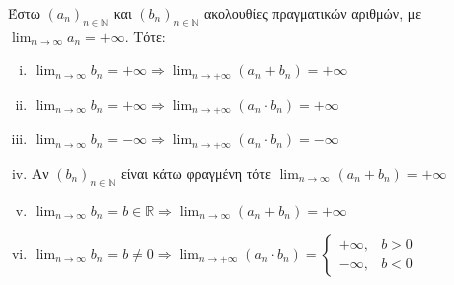 \documentclass[a4paper,table]{report}
\begin{document}
\begin{mybox3}
  \begin{prop}
    Έστω $ {(a_{n})}_{n \in \mathbb{N}} $ και $ {(b_{n})}_{n \in \mathbb{N}} $ ακολουθίες 
    πραγματικών αριθμών, με $ \lim_{n \to \infty} a_{n}= +\infty $. Τότε:
    \begin{enumerate}[i)]
      \item $ \lim_{n \to \infty} b_{n} = +\infty \Rightarrow \lim_{n \to +\infty}
        (a_{n}+b_{n})= +\infty$
      \item $ \lim_{n \to \infty} b_{n} = +\infty \Rightarrow \lim_{n \to +\infty}
        (a_{n}\cdot b_{n})= +\infty$
      \item $ \lim_{n \to \infty} b_{n} = -\infty \Rightarrow \lim_{n \to +\infty}
        (a_{n}\cdot b_{n})= -\infty$
      \item Αν $ {(b_{n})}_{n \in \mathbb{N}} $ είναι κάτω φραγμένη τότε $ \lim_{n \to
        \infty} (a_{n}+b_{n}) = +\infty $
      \item $ \lim_{n \to \infty} b_{n} = b \in \mathbb{R} 
        \Rightarrow \lim_{n \to \infty} (a_{n}+b_{n})= +\infty$
      \item $ \lim_{n \to \infty} b_{n} = b \neq 0 
        \Rightarrow \lim_{n \to +\infty} (a_{n}\cdot b_{n})= 
        \begin{cases} 
          +\infty, & b >0 \\
          -\infty, & b <0 
        \end{cases} $
    \end{enumerate}
  \end{prop}
\end{mybox3}
\end{document}
